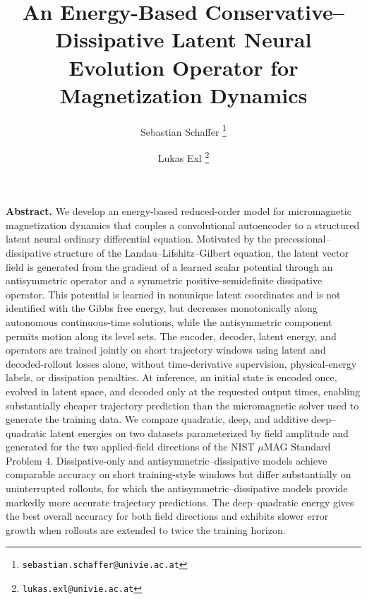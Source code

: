 \documentclass[a4paper,11pt]{article}
\begin{document}
\date{}
\title{An Energy-Based Conservative--Dissipative Latent Neural Evolution Operator for Magnetization Dynamics}

\author[a,b]{Sebastian Schaffer \thanks{\texttt{sebastian.schaffer@univie.ac.at}}}
\author[a,b]{Lukas Exl \thanks{\texttt{lukas.exl@univie.ac.at}}}


\setcounter{Maxaffil}{0}
\renewcommand\Affilfont{\itshape\small}

\maketitle
\textbf{Abstract.} 
We develop an energy-based reduced-order model for micromagnetic magnetization dynamics that couples a convolutional autoencoder to a structured latent neural ordinary differential equation. Motivated by the precessional–dissipative structure of the Landau–Lifshitz–Gilbert equation, the latent vector field is generated from the gradient of a learned scalar potential through an antisymmetric operator and a symmetric positive-semidefinite dissipative operator. This potential is learned in nonunique latent coordinates and is not identified with the Gibbs free energy, but decreases monotonically along autonomous continuous-time solutions, while the antisymmetric component permits motion along its level sets. The encoder, decoder, latent energy, and operators are trained jointly on short trajectory windows using latent and decoded-rollout losses alone, without time-derivative supervision, physical-energy labels, or dissipation penalties. At inference, an initial state is encoded once, evolved in latent space, and decoded only at the requested output times, enabling substantially cheaper trajectory prediction than the micromagnetic solver used to generate the training data. We compare quadratic, deep, and additive deep–quadratic latent energies on two datasets parameterized by field amplitude and generated for the two applied-field directions of the NIST $\mu$MAG Standard Problem 4. Dissipative-only and antisymmetric–dissipative models achieve comparable accuracy on short training-style windows but differ substantially on uninterrupted rollouts, for which the antisymmetric–dissipative models provide markedly more accurate trajectory predictions. The deep–quadratic energy gives the best overall accuracy for both field directions and exhibits slower error growth when rollouts are extended to twice the training horizon.
\end{document}
